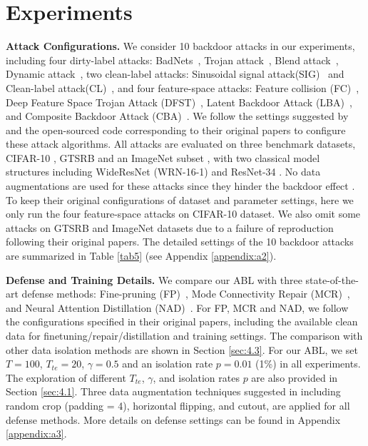 \section{Experiments} \label{sec:4}
\textbf{Attack Configurations.} We consider 10 backdoor attacks in our experiments, including four dirty-label attacks: BadNets~\cite{gu2017badnets}, Trojan attack~\cite{liu2018trojaning}, Blend attack~\cite{chen2017targeted}, Dynamic attack~\cite{nguyen2020input}, two clean-label attacks: Sinusoidal signal attack(SIG)~\cite{barni2019new} and Clean-label attack(CL)~\cite{turner2019clean}, and four feature-space attacks: Feature collision (FC)~\cite{shafahi2018poison}, Deep Feature Space Trojan Attack (DFST)~\cite{zhao2021deep}, Latent Backdoor Attack (LBA)~\cite{yao2019latent}, and Composite Backdoor Attack (CBA)~\cite{lin2020composite}. We follow the settings suggested by \cite{li2021neural} and the open-sourced code corresponding to their original papers to configure these attack algorithms. All attacks are evaluated on three benchmark datasets, CIFAR-10 \cite{krizhevsky2009learning}, GTSRB \cite{stallkamp2012man} and an ImageNet subset \cite{deng2009imagenet}, with two classical model structures including WideResNet (WRN-16-1) \cite{zagoruyko2016wide} and ResNet-34 \cite{he2016deep}. No data augmentations are used for these attacks since they hinder the backdoor effect \cite{liu2020reflection}. To keep their original configurations of dataset and parameter settings, here we only run the four feature-space attacks on CIFAR-10 dataset. We also omit some attacks on GTSRB and ImageNet datasets due to a failure of reproduction following their original papers. The detailed settings of the 10 backdoor attacks are summarized in Table \ref{tab5} (see Appendix \ref{appendix:a2}).

\textbf{Defense and Training Details.} We compare our ABL with three state-of-the-art defense methods: Fine-pruning (FP)~\cite{liu2018fine}, Mode Connectivity Repair (MCR)~\cite{zhao2020bridging}, and Neural Attention Distillation (NAD)~\cite{li2021neural}. For FP, MCR and NAD, we follow the configurations specified in their original papers, including the available clean data for finetuning/repair/distillation and training settings. The comparison with other data isolation methods are shown in Section \ref{sec:4.3}. For our ABL, we set $T=100$, $T_{te}=20$, $\gamma = 0.5$ and an isolation rate $p=0.01$ (1\%) in all experiments. The exploration of different $T_{te}$, $\gamma$, and isolation rates $p$ are also provided in Section \ref{sec:4.1}. Three data augmentation techniques suggested in \cite{li2021neural} including random crop (padding = 4), horizontal flipping, and cutout, are applied for all defense methods. More details on defense settings can be found in Appendix \ref{appendix:a3}.

